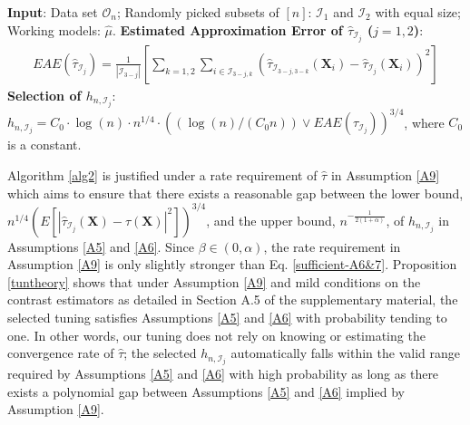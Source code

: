 \documentclass[11pt]{article}
\theoremstyle{referenceplain}
\theoremstyle{referencedefinition}
\theoremstyle{referenceremark}
\begin{document}
\begin{algorithm}
\caption{Selection of $h_{n,\mathcal{I}_j}$ ($j=1,2$)}
    \begin{algorithmic}[1]
        \State \textbf{Input}: Data set $\mathcal{O}_n$; Randomly picked subsets of $[n]$: $\mathcal{I}_1$ and $\mathcal{I}_2$ with equal size; Working models: $\widehat{\mu}$.
        \State \textbf{Estimated Approximation Error of $\widehat{\tau}_{\mathcal{I}_j}$ ($j=1,2$)}: 
 \begin{align*}
     EAE(\widehat{\tau}_{\mathcal{I}_j})=\frac{1}{|\mathcal{I}_{3-j}|}\left[\sum_{k=1,2}\sum_{i\in\mathcal{I}_{3-j,k}}\left(\widehat{\tau}_{\mathcal{I}_{3-j,3-k}}(\mathbf{X}_i)- \widehat{\tau}_{\mathcal{I}_{j}}(\mathbf{X}_i)\right)^2\right]
 \end{align*}
 \State \textbf{Selection of $h_{n,\mathcal{I}_j}$}: $h_{n,\mathcal{I}_j}={C_0}\cdot \log(n) \cdot n^{1/4}\cdot ((\log(n)/({C_0} n))\lor EAE(\widehat{\tau}_{\mathcal{I}_j}))^{3/4}$, where ${C_0}$ is a constant.
    \end{algorithmic}
    \label{alg2}
\end{algorithm}
Algorithm \ref{alg2} is justified under a rate requirement of $\widehat{\tau}$ in Assumption \ref{A9} which aims to ensure that there exists a reasonable gap between the lower bound, $n^{1/4}\left(E[|\widehat{\tau}_{\mathcal{I}_j}(\mathbf{X})-\tau(\mathbf{X})|^2]\right)^{3/4}$, and the upper bound, $n^{-\frac{1}{2(1+\alpha)}}$, of $h_{n,\mathcal{I}_j}$ in Assumptions \ref{A5} and \ref{A6}. Since $\beta\in(0,\alpha)$, the rate requirement in Assumption \ref{A9} is only slightly stronger than Eq. \eqref{sufficient-A6&7}. Proposition \ref{tuntheory} shows that under Assumption \ref{A9} and mild conditions on the contrast estimators as detailed in Section A.5 of the supplementary material, the selected tuning satisfies Assumptions \ref{A5} and \ref{A6} with probability tending to one. In other words, our tuning does not rely on knowing or estimating the convergence rate of $\widehat{\tau}$; the selected $h_{n,\mathcal{I}_j}$ automatically falls within the valid range required by Assumptions \ref{A5} and \ref{A6} with high probability as long as there exists a polynomial gap between Assumptions \ref{A5} and \ref{A6} implied by Assumption \ref{A9}.
\end{document}
